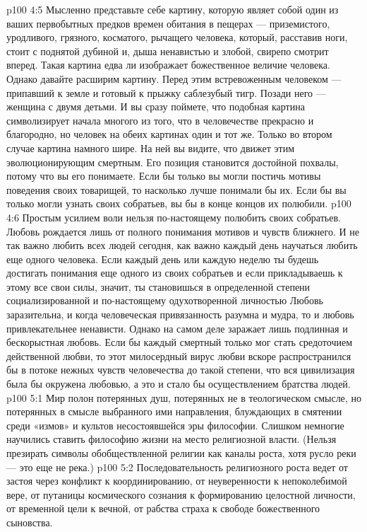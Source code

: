 \vs p100 4:5 Мысленно представьте себе картину, которую являет собой один из ваших первобытных предков времен обитания в пещерах --- приземистого, уродливого, грязного, косматого, рычащего человека, который, расставив ноги, стоит с поднятой дубиной и, дыша ненавистью и злобой, свирепо смотрит вперед. Такая картина едва ли изображает божественное величие человека. Однако давайте расширим картину. Перед этим встревоженным человеком --- припавший к земле и готовый к прыжку саблезубый тигр. Позади него --- женщина с двумя детьми. И вы сразу поймете, что подобная картина символизирует начала многого из того, что в человечестве прекрасно и благородно, но человек на обеих картинах один и тот же. Только во втором случае картина намного шире. На ней вы видите, что движет этим эволюционирующим смертным. Его позиция становится достойной похвалы, потому что вы его понимаете. Если бы только вы могли постичь мотивы поведения своих товарищей, то насколько лучше понимали бы их. Если бы вы только могли узнать своих собратьев, вы бы в конце концов их полюбили.
\vs p100 4:6 Простым усилием воли нельзя по\hyp{}настоящему полюбить своих собратьев. Любовь рождается лишь от полного понимания мотивов и чувств ближнего. И не так важно любить всех людей сегодня, как важно каждый день научаться любить еще одного человека. Если каждый день или каждую неделю ты будешь достигать понимания еще одного из своих собратьев и если прикладываешь к этому все свои силы, значит, ты становишься в определенной степени социализированной и по\hyp{}настоящему одухотворенной личностью Любовь заразительна, и когда человеческая привязанность разумна и мудра, то и любовь привлекательнее ненависти. Однако на самом деле заражает лишь подлинная и бескорыстная любовь. Если бы каждый смертный только мог стать средоточием действенной любви, то этот милосердный вирус любви вскоре распространился бы в потоке нежных чувств человечества до такой степени, что вся цивилизация была бы окружена любовью, а это и стало бы осуществлением братства людей.
\vs p100 5:1 Мир полон потерянных душ, потерянных не в теологическом смысле, но потерянных в смысле выбранного ими направления, блуждающих в смятении среди «измов» и культов несостоявшейся эры философии. Слишком немногие научились ставить философию жизни на место религиозной власти. (Нельзя презирать символы обобществленной религии как каналы роста, хотя русло реки --- это еще не река.)
\vs p100 5:2 Последовательность религиозного роста ведет от застоя через конфликт к координированию, от неуверенности к непоколебимой вере, от путаницы космического сознания к формированию целостной личности, от временной цели к вечной, от рабства страха к свободе божественного сыновства.
